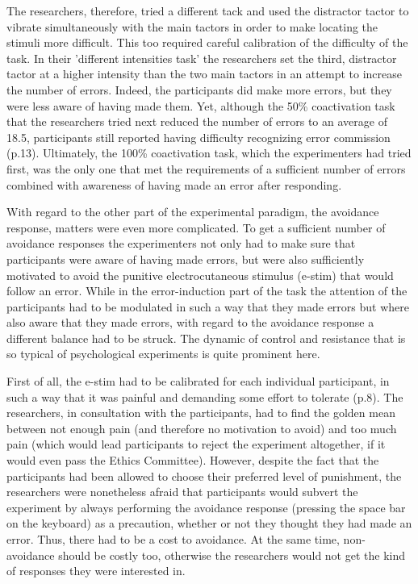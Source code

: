 \documentclass[twocolumn, serif, authordate, review]{jote-article}
\begin{document}
The researchers, therefore, tried a different tack and used the distractor tactor to vibrate simultaneously with the main tactors in order to make locating the stimuli more difficult. This too required careful calibration of the difficulty of the task. In their 'different intensities task' the researchers set the third, distractor tactor at a higher intensity than the two main tactors in an attempt to increase the number of errors. Indeed, the participants did make more errors, but they were less aware of having made them. Yet, although the 50\% coactivation task that the researchers tried next reduced the number of errors to an average of 18.5, participants still {\textquotedbl}reported having difficulty recognizing error commission{\textquotedbl} (p.13). Ultimately, the 100\% coactivation task, which the experimenters had tried first, was the only one that met the requirements of a sufficient number of errors combined with awareness of having made an error after responding.

With regard to the other part of the experimental paradigm, the avoidance response, matters were even more complicated. To get a sufficient number of avoidance responses the experimenters not only had to make sure that participants were aware of having made errors, but were also sufficiently motivated to avoid the punitive electrocutaneous stimulus (e-stim) that would follow an error. While in the error-induction part of the task the attention of the participants had to be modulated in such a way that they made errors but where also aware that they made errors, with regard to the avoidance response a different balance had to be struck. The dynamic of control and resistance that is so typical of psychological experiments is quite prominent here.

First of all, the e-stim had to be calibrated for each individual participant, in such a way that it was {\textquotedbl}painful and demanding some effort to tolerate{\textquotedbl} (p.8). The researchers, in consultation with the participants, had to find the golden mean between not enough pain (and therefore no motivation to avoid) and too much pain (which would lead participants to reject the experiment altogether, if it would even pass the Ethics Committee). However, despite the fact that the participants had been allowed to choose their preferred level of punishment, the researchers were nonetheless afraid that participants would subvert the experiment by always performing the avoidance response (pressing the space bar on the keyboard) as a precaution, whether or not they thought they had made an error. Thus, there had to be a cost to avoidance. At the same time, non-avoidance should be costly too, otherwise the researchers would not get the kind of responses they were interested in.
\end{document}

